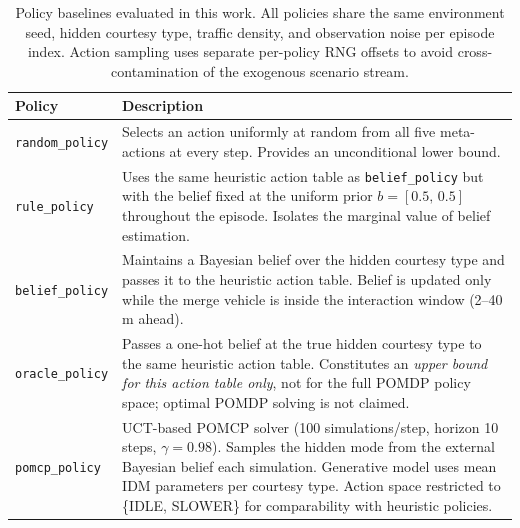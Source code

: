 \begin{table}[htbp]
\centering
\caption{Policy baselines evaluated in this work.
  All policies share the same environment seed, hidden courtesy type,
  traffic density, and observation noise per episode index.
  Action sampling uses separate per-policy RNG offsets to avoid
  cross-contamination of the exogenous scenario stream.}
\label{tab:policy_defs}
\small
\begin{tabular}{lp{8.5cm}}
\toprule
\textbf{Policy} & \textbf{Description} \\
\midrule
\texttt{random\_policy}
  & Selects an action uniformly at random from all five meta-actions at every
    step. Provides an unconditional lower bound. \\
\addlinespace
\texttt{rule\_policy}
  & Uses the same heuristic action table as \texttt{belief\_policy} but with
    the belief fixed at the uniform prior $b=[0.5,\,0.5]$ throughout the
    episode. Isolates the marginal value of belief estimation. \\
\addlinespace
\texttt{belief\_policy}
  & Maintains a Bayesian belief over the hidden courtesy type and passes it to
    the heuristic action table. Belief is updated only while the merge vehicle
    is inside the interaction window (2--40\,m ahead). \\
\addlinespace
\texttt{oracle\_policy}
  & Passes a one-hot belief at the true hidden courtesy type to the same
    heuristic action table. Constitutes an \emph{upper bound for this action
    table only}, not for the full POMDP policy space; optimal POMDP solving
    is not claimed. \\
\addlinespace
\texttt{pomcp\_policy}
  & UCT-based POMCP solver (100 simulations/step, horizon 10 steps, $\gamma{=}0.98$).
    Samples the hidden mode from the external Bayesian belief each simulation.
    Generative model uses mean IDM parameters per courtesy type.
    Action space restricted to \{IDLE, SLOWER\} for comparability with
    heuristic policies. \\
\bottomrule
\end{tabular}
\end{table}
